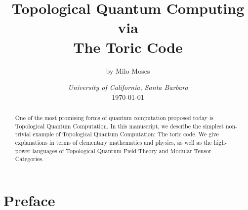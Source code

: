 \documentclass{article}
\title{Topological Quantum Computing\\ via \\ The Toric Code}
\author{by Milo Moses}
\date{\textit{University of California, Santa Barbara} \\ [2ex] \today}
\theoremstyle{definition}
\numberwithin{figure}{section}
\begin{document}
\maketitle

\newcommand{\RR}{\mathbb{R}}
\newcommand{\HH}{\mathbb{H}}
\newcommand{\NN}{\mathbb{N}}
\newcommand{\QQ}{\mathbb{Q}}
\newcommand{\CC}{\mathbb{C}}
\newcommand{\FF}{\mathbb{F}}
\newcommand{\ZZ}{\mathbb{Z}}
\newcommand{\Zcal}{\mathcal{Z}}
\newcommand{\Ncal}{\mathcal{N}}
\newcommand{\LL}{\mathscr{L}}
\newcommand{\TT}{\mathcal{T}}
\newcommand{\Ccat}{\mathscr{C}}
\newcommand{\Dcat}{\mathscr{D}}
\newcommand{\st}{\,\,\mathrm{s.t}\,\,}
\newcommand{\mm}{\mathfrak{m}}
\newcommand{\pp}{\mathfrak{p}}
\newcommand{\Hom}{\mathrm{Hom}}
\newcommand{\Aut}{\mathrm{Aut}}
\newcommand{\Frac}{\mathrm{Frac}}
\newcommand{\tr}{\mathrm{tr}}
\newcommand{\res}{\mathrm{res}}
\newcommand{\im}{\mathrm{im}}
\newcommand{\ev}{\mathrm{ev}}
\newcommand{\coev}{\mathrm{coev}}
\newcommand{\id}{\mathrm{id}}
\newcommand{\coker}{\mathrm{coker}}
\newcommand{\SL}{\mathrm{SL}}
\newcommand{\End}{\mathrm{End}}
\newcommand{\Rep}{\bold{Rep}}
\newcommand{\Set}{\bold{Set}}
\newcommand{\Vecc}{\bold{Vec}}
\newcommand{\Hilb}{\bold{Hilb}}
\newcommand{\Bord}{\bold{Bord}}
\newcommand{\0}{\left|0\right>}
\newcommand{\1}{\left|1\right>}
\newcommand{\nullclass}{\left|\bold{0}\right>}
\newcommand{\alphaclass}{\left|\alpha\right>}
\newcommand{\betaclass}{\left|\beta\right>}
\newcommand{\alphabetaclass}{\left|\alpha\beta\right>}
\newcommand{\ppsi}{\left|\psi\right>}
\newcommand{\bigleadsto}{\mathlarger{\mathlarger{\mathlarger{\leadsto}}}}
\newcommand{\vin}{\rotatebox[origin=c]{-90}{$\in$}}


\begin{abstract}
One of the most promising forms of quantum computation proposed today is Topological Quantum Computation. In this manuscript, we describe the simplest non-trivial example of Topological Quantum Computation: The toric code. We give explanations in terms of elementary mathematics and physics, as well as the high-power languages of Topological Quantum Field Theory and Modular Tensor Categories.
\end{abstract}

\newpage

\tableofcontents

\newpage

\section{Preface}
\label{Preface}
\end{document}
